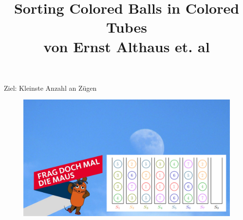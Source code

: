 \documentclass{beamer}
\author[Philipp Geier]{}
\title[Sorting Colored Balls in Colored Tubes]{Sorting Colored Balls in Colored Tubes \\ von Ernst Althaus et. al}
\institute[Universität Trier]{}
\date{}
\begin{document}
{
  \begin{frame}
    \maketitle
  \end{frame}
}
    
	


\begin{frame}{Ziel: Kleinste Anzahl an Zügen}
	\begin{figure}[ht]
		\includegraphics[width=\textwidth]{maus}
    \end{figure}
\end{frame}
\end{document}
